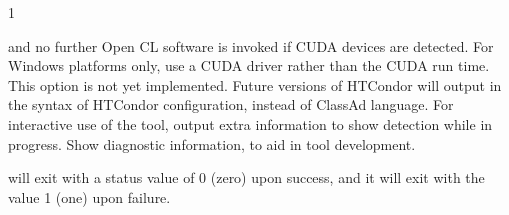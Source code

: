 \begin{ManPage}{\label{man-condor-gpu-discovery}}{1}
\begin{Options}
{    and no further Open CL software is invoked if CUDA devices are detected.
  }
   {
    For Windows platforms only, use a CUDA driver rather than the
    CUDA run time.
  }
   {
    This option is not yet implemented.
    Future versions of HTCondor will output in the syntax of 
    HTCondor configuration, instead of ClassAd language.
  }
   {
    For interactive use of the tool, output extra information to show 
    detection while in progress.
  }
   {
    Show diagnostic information, to aid in tool development.
  }
\end{Options}

\ExitStatus

 will exit with a status value of 0 (zero) upon success,
and it will exit with the value 1 (one) upon failure.


\end{ManPage}
